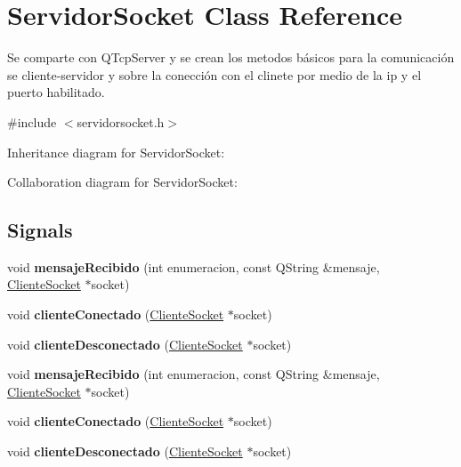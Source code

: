 \hypertarget{class_servidor_socket}{}\section{Servidor\+Socket Class Reference}
\label{class_servidor_socket}


Se comparte con Q\+Tcp\+Server y se crean los metodos básicos para la comunicación se cliente-\/servidor y sobre la conección con el clinete por medio de la ip y el puerto habilitado.  




{\ttfamily \#include $<$servidorsocket.\+h$>$}



Inheritance diagram for Servidor\+Socket\+:


Collaboration diagram for Servidor\+Socket\+:
\subsection*{Signals}
\begin{DoxyCompactItemize}
\item 
\mbox{\label{class_servidor_socket_af81248e8b6bcf181e8f0bb9c76aff878}} 
void {\bfseries mensaje\+Recibido} (int enumeracion, const Q\+String \&mensaje, \hyperlink{class_cliente_socket}{Cliente\+Socket} $\ast$socket)
\item 
\mbox{\label{class_servidor_socket_ae7cc887e6dab5eec033fa82ca2c3d81b}} 
void {\bfseries cliente\+Conectado} (\hyperlink{class_cliente_socket}{Cliente\+Socket} $\ast$socket)
\item 
\mbox{\label{class_servidor_socket_a867912d9e6ef29ddae33625517ab16c4}} 
void {\bfseries cliente\+Desconectado} (\hyperlink{class_cliente_socket}{Cliente\+Socket} $\ast$socket)
\item 
\mbox{\label{class_servidor_socket_af81248e8b6bcf181e8f0bb9c76aff878}} 
void {\bfseries mensaje\+Recibido} (int enumeracion, const Q\+String \&mensaje, \hyperlink{class_cliente_socket}{Cliente\+Socket} $\ast$socket)
\item 
\mbox{\label{class_servidor_socket_ae7cc887e6dab5eec033fa82ca2c3d81b}} 
void {\bfseries cliente\+Conectado} (\hyperlink{class_cliente_socket}{Cliente\+Socket} $\ast$socket)
\item 
\mbox{\label{class_servidor_socket_a867912d9e6ef29ddae33625517ab16c4}} 
void {\bfseries cliente\+Desconectado} (\hyperlink{class_cliente_socket}{Cliente\+Socket} $\ast$socket)
\end{DoxyCompactItemize}
